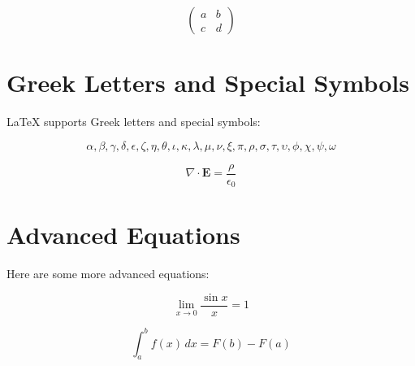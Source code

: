 \documentclass{article}
\begin{document}
\begin{equation}
\begin{pmatrix}
a & b \\
c & d
\end{pmatrix}
\end{equation}

\section{Greek Letters and Special Symbols}
LaTeX supports Greek letters and special symbols:

\begin{equation}
\alpha, \beta, \gamma, \delta, \epsilon, \zeta, \eta, \theta, \iota, \kappa, \lambda, \mu, \nu, \xi, \pi, \rho, \sigma, \tau, \upsilon, \phi, \chi, \psi, \omega
\end{equation}

\begin{equation}
\nabla \cdot \mathbf{E} = \frac{\rho}{\epsilon_0}
\end{equation}

\section{Advanced Equations}
Here are some more advanced equations:

\begin{equation}
\lim_{x \to 0} \frac{\sin x}{x} = 1
\end{equation}

\begin{equation}
\int_a^b f(x) \, dx = F(b) - F(a)
\end{equation}
\end{document}
